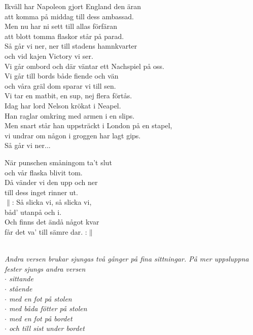 \documentclass[a6paper,10pt]{article}
\begin{document}
\setlength{\oddsidemargin}{-0.37in}
\noindent
\begin{center}
\end{center}
\begin{lyrics}
Ikväll har Napoleon gjort England den äran\\
att komma på middag till dess ambassad.\\
Men nu har ni sett till allas förfäran\\
att blott tomma flaskor står på parad.
\vspace{5pt}\\
Så går vi ner, ner till stadens hamnkvarter\\
och vid kajen Victory vi ser.\\
Vi går ombord och där väntar ett Nachspiel på oss.\\
Vi går till bords både fiende och vän\\
och våra gräl dom sparar vi till sen.\\
Vi tar en matbit, en sup, nej flera förtås.
\vspace{5pt}\\
Idag har lord Nelson krökat i Neapel.\\
Han raglar omkring med armen i en slips.\\
Men snart står han uppsträckt i London på en stapel,\\
vi undrar om någon i groggen har lagt gips.
\vspace{5pt}\\
Så går vi ner...
\end{lyrics}

\setlength{\oddsidemargin}{-0.47in}
\noindent
\begin{center}
\end{center}
\begin{lyrics}
När punschen småningom ta't slut\\
och vår flaska blivit tom.\\
Då vänder vi den upp och ner\\
till dess inget rinner ut.
\vspace{5pt}\\
$\|$: Så slicka vi, så slicka vi,\\
båd' utanpå och i.\\
Och finns det ändå något kvar\\
får det va' till sämre dar. :$\|$
\end{lyrics}
\vspace{10pt}\\ %
\textit{Andra versen brukar sjungas två gånger på fina sittningar. På mer uppsluppna fester sjungs andra versen\\
$\cdot$ sittande\\
$\cdot$ stående\\
$\cdot$ med en fot på stolen\\
$\cdot$ med båda fötter på stolen\\
$\cdot$ med en fot på bordet\\
$\cdot$ och till sist under bordet}
\end{document}
